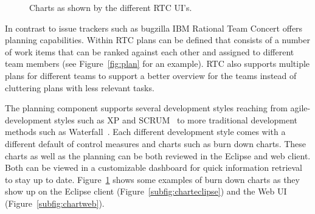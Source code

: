 \begin{figure}[t]
\centering
{}
\caption{Charts as shown by the different RTC UI's.}
\label{fig:charts}
\end{figure}
In contrast to issue trackers such as bugzilla IBM Rational Team Concert offers planning capabilities.
Within RTC plans can be defined that consists of a number of work items that can be ranked against each other and assigned to different team members (see Figure~\ref{fig:plan} for an example).
RTC also supports multiple plans for different teams to support a better overview for the teams instead of cluttering plans with less relevant tasks.

The planning component supports several development styles reaching from agile-development styles such as XP and SCRUM~\cite{larman:ieeecomputer:2003} to more traditional development methods such as Waterfall~\cite{boehm:senotes:1986}.
Each different development style comes with a different default of control measures and charts such as burn down charts.
These charts as well as the planning can be both reviewed in the Eclipse and web client.
Both can be viewed in a customizable dashboard for quick information retrieval to stay up to date.
Figure~\ref{fig:charts} shows some examples of burn down charts as they show up on the Eclipse client (Figure~\ref{subfig:charteclipse}) and the Web UI (Figure~\ref{subfig:chartweb}).

